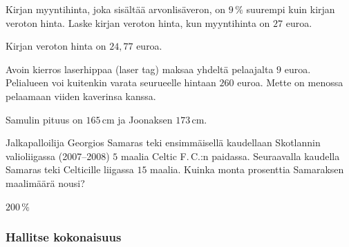 \begin{tehtavasivu}
\begin{tehtava}
    Kirjan myyntihinta, joka sisältää arvonlisäveron, on $9\,\%$ suurempi kuin kirjan veroton hinta. Laske kirjan veroton hinta, kun myyntihinta on $27$ euroa.
    \begin{vastaus}
        Kirjan veroton hinta on $24,77$ euroa.
    \end{vastaus}
\end{tehtava}

\begin{tehtava}
	Avoin kierros laserhippaa (laser tag) maksaa yhdeltä pelaajalta $9$ euroa. Pelialueen voi kuitenkin varata seurueelle hintaan $260$ euroa. Mette on menossa pelaamaan viiden kaverinsa kanssa. 
	\begin{vastaus}
	\end{vastaus}

\end{tehtava}

\begin{tehtava}
    Samulin pituus on $165$\,cm ja Joonaksen $173$\,cm.
    \begin{vastaus}
    \end{vastaus}
\end{tehtava}

\begin{tehtava}
    Jalkapalloilija Georgios Samaras teki ensimmäisellä kaudellaan Skotlannin valioliigassa (2007--2008) $5$ maalia Celtic F.\,C.:n paidassa. Seuraavalla kaudella Samaras teki Celticille liigassa $15$ maalia. Kuinka monta prosenttia Samaraksen maalimäärä nousi?
    \begin{vastaus}
        $200\,\%$
    \end{vastaus}
\end{tehtava}

\subsubsection*{Hallitse kokonaisuus}


\end{tehtavasivu}
